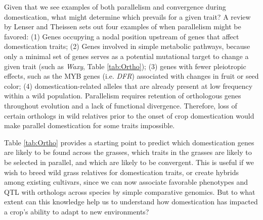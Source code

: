 \documentclass[12pt]{article}
\begin{document}
Given that we see examples of both parallelism and convergence during domestication, what might determine which prevails for a given trait?
A review by Lenser and Theissen \citep{Lenser2013} sets out four examples of when parallelism might be favored: (1) Genes occupying a nodal position upstream of genes that affect domestication traits; (2) Genes involved in simple metabolic pathways, because only a minimal set of genes serves as a potential mutational target to change a given trait (such as \textit{Waxy}, Table \ref{tab:Ortho}); (3) genes with fewer pleiotropic effects, such as the MYB genes (i.e. \textit{DFR}) associated with changes in fruit or seed color; (4) domestication-related alleles that are already present at low frequency within a wild population. 
Parallelism requires retention of orthologous genes throughout evolution and a lack of functional divergence.
Therefore, loss of certain orthologs in wild relatives prior to the onset of crop domestication would make parallel domestication for some traits impossible.

Table \ref{tab:Ortho} provides a starting point to predict which domestication genes are likely to be found across the grasses, which traits in the grasses are likely to be selected in parallel, and which are likely to be convergent.
This is useful if we wish to breed wild grass relatives for domestication traits, or create hybrids among existing cultivars, since we can now associate favorable phenotypes and QTL with orthologs across species by simple comparative genomics.
But to what extent can this knowledge help us to understand how domestication has impacted a crop's ability to adapt to new environments?
\paragraph{}
\end{document}
